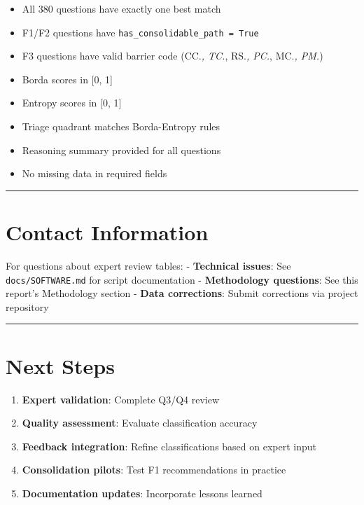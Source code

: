 \documentclass[
  letterpaper,
]{report}
\providecommand{\tightlist}{%
  \setlength{\itemsep}{0pt}\setlength{\parskip}{0pt}}
\begin{document}
\begin{itemize}
\tightlist
\item[$\square$]
  All 380 questions have exactly one best match
\item[$\square$]
  F1/F2 questions have \texttt{has\_consolidable\_path\ =\ True}
\item[$\square$]
  F3 questions have valid barrier code (CC.\emph{, TC.}, RS.\emph{,
  PC.}, MC.\emph{, PM.})
\item[$\square$]
  Borda scores in {[}0, 1{]}
\item[$\square$]
  Entropy scores in {[}0, 1{]}
\item[$\square$]
  Triage quadrant matches Borda-Entropy rules
\item[$\square$]
  Reasoning summary provided for all questions
\item[$\square$]
  No missing data in required fields
\end{itemize}

\begin{center}\rule{0.5\linewidth}{0.5pt}\end{center}

\section{Contact Information}\label{contact-information}

For questions about expert review tables: - \textbf{Technical issues}:
See \texttt{docs/SOFTWARE.md} for script documentation -
\textbf{Methodology questions}: See this report's Methodology section -
\textbf{Data corrections}: Submit corrections via project repository

\begin{center}\rule{0.5\linewidth}{0.5pt}\end{center}

\section{Next Steps}\label{next-steps-1}

\begin{enumerate}
\def\labelenumi{\arabic{enumi}.}
\tightlist
\item
  \textbf{Expert validation}: Complete Q3/Q4 review
\item
  \textbf{Quality assessment}: Evaluate classification accuracy
\item
  \textbf{Feedback integration}: Refine classifications based on expert
  input
\item
  \textbf{Consolidation pilots}: Test F1 recommendations in practice
\item
  \textbf{Documentation updates}: Incorporate lessons learned
\end{enumerate}
\end{document}
